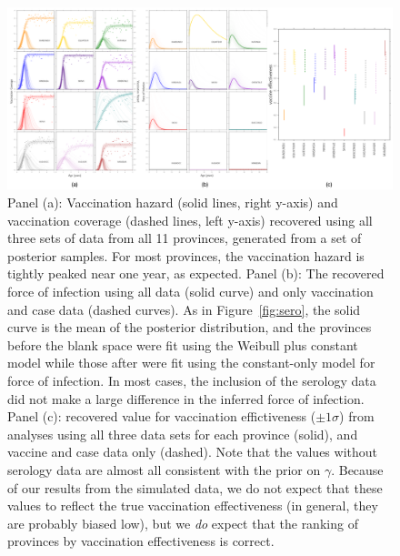 \documentclass[nofootinbib,aps,pre,twocolumn,superscriptaddress,showkeys,showpacs]{revtex4-1}
\begin{document}
\begin{figure}
\includegraphics[width=\textwidth,angle=0]{figures/VacFOIveff-crop.pdf}
\caption{\label{fig:foivaccveff} Panel (a): Vaccination hazard (solid lines, right y-axis) and vaccination coverage (dashed lines, left y-axis) recovered using all three sets of data from all 11 provinces, generated from a set of posterior samples. For most provinces, the vaccination hazard is tightly peaked near one year, as expected. Panel (b): The recovered force of infection using all data (solid curve) and only vaccination and case data (dashed curves). As in Figure~\ref{fig:sero}, the solid curve is the mean of the posterior distribution, and the provinces before the blank space were fit using the Weibull plus constant model while those after were fit using the constant-only model for force of infection. In most cases, the inclusion of the serology data did not make a large difference in the inferred force of infection. Panel (c): recovered value for vaccination effictiveness ($\pm 1\sigma$) from analyses using all three data sets for each province (solid), and vaccine and case data only (dashed). Note that the values without serology data are almost all consistent with the prior on $\gamma$. Because of our results from the simulated data, we do not expect that these values to reflect the true vaccination effectiveness (in general, they are probably biased low), but we \emph{do} expect that the ranking of provinces by vaccination effectiveness is correct.}
\end{figure}
\end{document}
